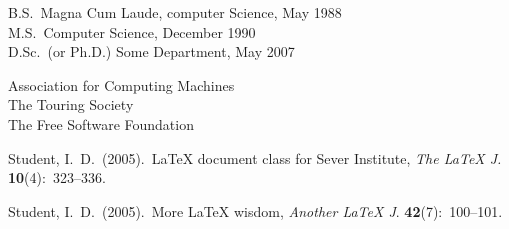 %
%
%
\begin{center}
{\large\thesisauthor}
\end{center}
%
%
\newcommand{\vitalabel}[1]%
  {\raisebox{0pt}[1ex][0pt]
    {\makebox[\labelwidth][l]%
      {\parbox[t]{\labelwidth}{\hspace{0pt}\textbf{#1}}}}}
%
%
\begin{list}
  {}%
  { \renewcommand{\makelabel}{\vitalabel}%
    \setlength{\labelwidth}{100pt}%
    \setlength{\leftmargin}{120pt}%
    \setlength{\itemindent}{0pt}%
    \setlength{\parsep}{\baselineskip}%
    \setlength{\itemsep}{5pt}%
    }

\item[Degrees] B.S.\ Magna Cum Laude, computer Science, May 1988 \\
	M.S.\ Computer Science, December 1990 \\
	D.Sc.\ (or Ph.D.) Some Department, May 2007
\item[Professional\linebreak Societies]
  Association for Computing Machines \\
  The Touring Society \\
  The Free Software Foundation
\item[Publications]
  Student, I.\ D.\ (2005).\ \LaTeX{} document class for Sever Institute,
  \textit{The \LaTeX{} J.} \textbf{10}(4):~323--336.
  
  Student, I.\ D.\ (2005).\ More \LaTeX{} wisdom, \textit{Another \LaTeX{} J}.
  \textbf{42}(7):~100--101.
\end{list}
\flushright
\thesismonth\ \thesisyear


